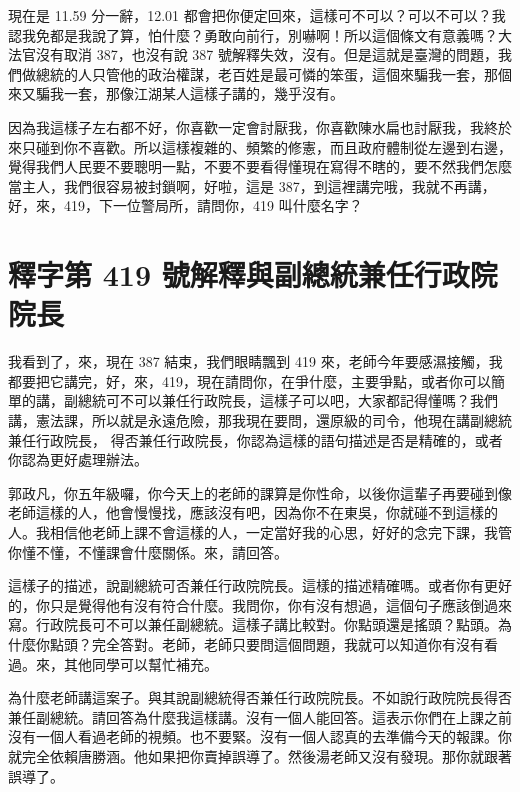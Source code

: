 \hypertarget{c08:cue:49}{}現在是 11.59 分一辭，12.01 都會把你便定回來，這樣可不可以？可以不可以？我認我免都是我說了算，怕什麼？勇敢向前行，別嚇啊！所以這個條文有意義嗎？大法官沒有取消 387，也沒有說 387 號解釋失效，沒有。但是這就是臺灣的問題，我們做總統的人只管他的政治權謀，老百姓是最可憐的笨蛋，這個來騙我一套，那個來又騙我一套，那像江湖某人這樣子講的，幾乎沒有。

\hypertarget{c08:cue:50}{}因為我這樣子左右都不好，你喜歡一定會討厭我，你喜歡陳水扁也討厭我，我終於來只碰到你不喜歡。所以這樣複雜的、頻繁的修憲，而且政府體制從左邊到右邊，覺得我們人民要不要聰明一點，不要不要看得懂現在寫得不瞎的，要不然我們怎麼當主人，我們很容易被封鎖啊，好啦，這是 387，到這裡講完哦，我就不再講，好，來，419，下一位警局所，請問你，419 叫什麼名字？

\section{釋字第 419 號解釋與副總統兼任行政院院長}

\hypertarget{c08:cue:51}{}我看到了，來，現在 387 結束，我們眼睛飄到 419 來，老師今年要感濕接觸，我都要把它講完，好，來，419，現在請問你，在爭什麼，主要爭點，或者你可以簡單的講，副總統可不可以兼任行政院長，這樣子可以吧，大家都記得懂嗎？我們講，憲法課，所以就是永遠危險，那我現在要問，還原級的司令，他現在講副總統兼任行政院長，
\hypertarget{c08:cue:52}{}得否兼任行政院長，你認為這樣的語句描述是否是精確的，或者你認為更好處理辦法。

\hypertarget{c08:cue:53}{}郭政凡，你五年級囉，你今天上的老師的課算是你性命，以後你這輩子再要碰到像老師這樣的人，他會慢慢找，應該沒有吧，因為你不在東吳，你就碰不到這樣的人。我相信他老師上課不會這樣的人，一定當好我的心思，好好的念完下課，我管你懂不懂，不懂課會什麼關係。來，請回答。

\hypertarget{c08:cue:54}{}這樣子的描述，說副總統可否兼任行政院院長。這樣的描述精確嗎。或者你有更好的，你只是覺得他有沒有符合什麼。我問你，你有沒有想過，這個句子應該倒過來寫。行政院長可不可以兼任副總統。這樣子講比較對。你點頭還是搖頭？點頭。為什麼你點頭？完全答對。老師，老師只要問這個問題，我就可以知道你有沒有看過。來，其他同學可以幫忙補充。

\hypertarget{c08:cue:55}{}為什麼老師講這案子。與其說副總統得否兼任行政院院長。不如說行政院院長得否兼任副總統。請回答為什麼我這樣講。沒有一個人能回答。這表示你們在上課之前沒有一個人看過老師的視頻。也不要緊。沒有一個人認真的去準備今天的報課。你就完全依賴唐勝涵。他如果把你賣掉誤導了。然後湯老師又沒有發現。那你就跟著誤導了。

